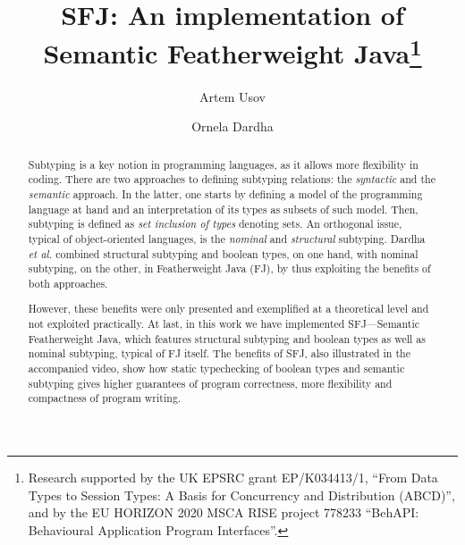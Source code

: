\documentclass[runningheads]{llncs}
\begin{document}
\title{SFJ: An implementation of Semantic Featherweight Java\thanks{Research supported by the UK EPSRC grant EP/K034413/1, ``From Data Types to Session Types: A Basis for Concurrency and Distribution (ABCD)'', and by the EU HORIZON 2020 MSCA RISE project 778233 ``BehAPI: Behavioural Application Program Interfaces''.}}

\author{Artem Usov \and Ornela Dardha}


\maketitle

\begin{abstract}
Subtyping is a key notion in programming languages, as it allows more flexibility in coding.
There are two approaches to defining subtyping relations: the \emph{syntactic} and the \emph{semantic} approach.
In the latter, one starts by defining a model of the programming language at hand and an interpretation of its types as subsets of such model.
Then, subtyping is defined as \emph{set inclusion of types} denoting sets.
An orthogonal issue, typical of object-oriented languages, is the \emph{nominal} and \emph{structural} subtyping.
Dardha \emph{et al.} \cite{Dardha2013,Dardha2017} combined structural subtyping and boolean types, on one hand, with nominal subtyping, on the other, in Featherweight Java (FJ), by thus exploiting the benefits of both approaches.

However, these benefits were only presented and exemplified at a theoretical level and not exploited practically. 
At last, in this work we have implemented SFJ---Semantic Featherweight Java, which features structural subtyping and boolean types as well as nominal subtyping, typical of FJ itself.
The benefits of SFJ, also illustrated in the accompanied video, show how static typechecking of boolean types and semantic subtyping gives higher guarantees of program correctness, more flexibility and compactness of program writing.
\end{abstract}
\end{document}
